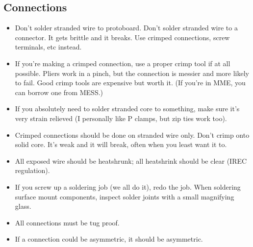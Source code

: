 \documentclass{article}
\begin{document}
\subsection{Connections}
\begin{itemize}
\item Don't solder stranded wire to protoboard. Don't solder stranded wire to a connector. It gets brittle and it breaks. Use crimped connections, screw terminals, etc instead.
\item If you're making a crimped connection, use a proper crimp tool if at all possible. Pliers work in a pinch, but the connection is messier and more likely to fail. Good crimp tools are expensive but worth it. (If you're in MME, you can borrow one from MESS.)
\item If you absolutely need to solder stranded core to something, make sure it's very strain relieved (I personally like P clamps, but zip ties work too).
\item Crimped connections should be done on stranded wire only. Don't crimp onto solid core. It's weak and it will break, often when you least want it to.
\item All exposed wire should be heatshrunk; all heatshrink should be clear (IREC regulation).
\item If you screw up a soldering job (we all do it), redo the job. When soldering surface mount components, inspect solder joints with a small magnifying glass.
\item All connections must be tug proof.
\item If a connection could be asymmetric, it should be asymmetric.
\end{itemize}
\end{document}
